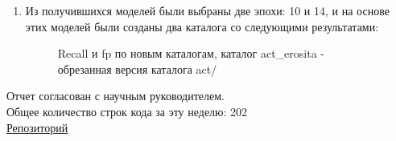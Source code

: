 \documentclass{article}
\begin{document}
\begin{enumerate}
    \item Из получившихся моделей были выбраны две эпохи: 10 и 14, и на основе этих моделей были 
        созданы два каталога со следующими результатами:\\
    \begin{figure}[h]
        \caption{Recall и fp по новым каталогам, каталог act\_erosita - обрезанная версия каталога 
        act/}
    \end{figure}


\end{enumerate}

Отчет согласован с научным руководителем.\\
Общее количество строк кода за эту неделю: 202\\
\hyperlink{https://github.com/rt2122/data-segmentation-2}{Репозиторий}\\ 
\end{document}
